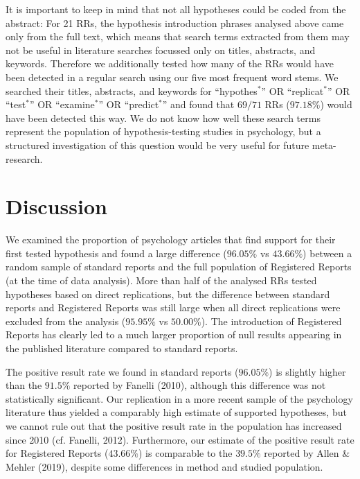 \documentclass[british,,man,floatsintext]{apa6}
\begin{document}
It is important to keep in mind that not all hypotheses could be coded from the abstract: For 21 RRs, the hypothesis introduction phrases analysed above came only from the full text, which means that search terms extracted from them may not be useful in literature searches focussed only on titles, abstracts, and keywords.
Therefore we additionally tested how many of the RRs would have been detected in a regular search using our five most frequent word stems.
We searched their titles, abstracts, and keywords for \enquote{hypothes\(^\ast\)} OR \enquote{replicat\(^\ast\)} OR \enquote{test\(^\ast\)} OR \enquote{examine\(^\ast\)} OR \enquote{predict\(^\ast\)} and found that \(69/71\) RRs (\(97.18 \%\)) would have been detected this way.
We do not know how well these search terms represent the population of hypothesis-testing studies in psychology, but a structured investigation of this question would be very useful for future meta-research.

\hypertarget{discussion}{%
\section{Discussion}\label{discussion}}

We examined the proportion of psychology articles that find support for their first tested hypothesis and found a large difference (\(96.05 \%\) vs \(43.66 \%\)) between a random sample of standard reports and the full population of Registered Reports (at the time of data analysis).
More than half of the analysed RRs tested hypotheses based on direct replications, but the difference between standard reports and Registered Reports was still large when all direct replications were excluded from the analysis (\(95.95 \%\) vs \(50.00 \%\)).
The introduction of Registered Reports has clearly led to a much larger proportion of null results appearing in the published literature compared to standard reports.

The positive result rate we found in standard reports (\(96.05 \%\)) is slightly higher than the \(91.5\%\) reported by Fanelli (2010), although this difference was not statistically significant.
Our replication in a more recent sample of the psychology literature thus yielded a comparably high estimate of supported hypotheses, but we cannot rule out that the positive result rate in the population has increased since 2010 (cf. Fanelli, 2012).
Furthermore, our estimate of the positive result rate for Registered Reports (\(43.66 \%\)) is comparable to the \(39.5\%\) reported by Allen \& Mehler (2019), despite some differences in method and studied population.
\end{document}
